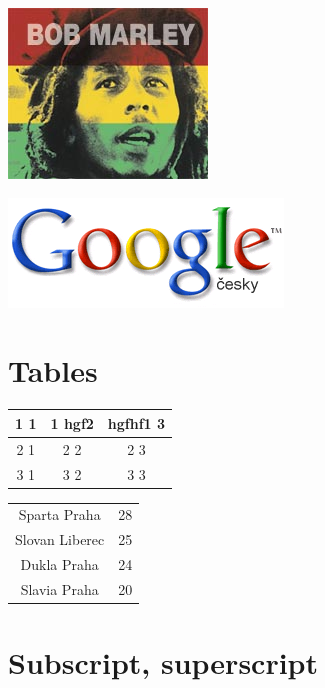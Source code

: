 \documentclass{article}
\begin{document}
\par \begin{center}
\includegraphics[]{marley.jpg} \\
\end{center}


\par \includegraphics[]{logo.png} \\

 
\section*{Tables}
 
 \begin{table}[!ht]

 \begin{tabular}{ |c|c|c| }
\hline   1 1 & 1 hgf2 & hgfhf1 3\\ 
\hline 2 1 & 2 2 & 2 3\\ 
\hline 3 1 & 3 2 & 3 3\\ 
\hline 
 \end{tabular}
\end{table}


 \begin{table}[!ht]

 \begin{tabular}{ c c  }
   Sparta Praha & 28\\ 
 Slovan Liberec & 25\\ 
 Dukla Praha & 24\\ 
 Slavia Praha & 20\\ 
 
 \end{tabular}
\end{table}
 
\section*{Subscript, superscript}
 
\end{document}
